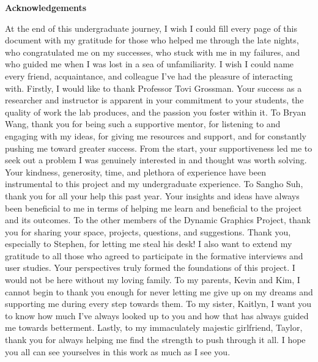 \documentclass[12pt]{report}
\begin{document}
\begin{myfont}
        \vspace*{\fill}
            \begin{center}
                \singlespacing
                \normalsize
                \begin{minipage}{0.8\textwidth}
                    \setlength{\parindent}{0pt}
                    \begin{center}
                        \Large\textbf{Acknowledgements}
                    \end{center}
                        At the end of this undergraduate journey, I wish I could fill every page of this document with my gratitude for those who helped me through the late nights, who congratulated me on my successes, who stuck with me in my failures, and who guided me when I was lost in a sea of unfamiliarity. I wish I could name every friend, acquaintance, and colleague I've had the pleasure of interacting with. Firstly, I would like to thank Professor Tovi Grossman. Your success as a researcher and instructor is apparent in your commitment to your students, the quality of work the lab produces, and the passion you foster within it. To Bryan Wang, thank you for being such a supportive mentor, for listening to and engaging with my ideas, for giving me resources and support, and for constantly pushing me toward greater success. From the start, your supportiveness led me to seek out a problem I was genuinely interested in and thought was worth solving. Your kindness, generosity, time, and plethora of experience have been instrumental to this project and my undergraduate experience. To Sangho Suh, thank you for all your help this past year. Your insights and ideas have always been beneficial to me in terms of helping me learn and beneficial to the project and its outcomes. To the other members of the Dynamic Graphics Project, thank you for sharing your space, projects, questions, and suggestions. Thank you, especially to Stephen, for letting me steal his desk! I also want to extend my gratitude to all those who agreed to participate in the formative interviews and user studies. Your perspectives truly formed the foundations of this project. I would not be here without my loving family. To my parents, Kevin and Kim, I cannot begin to thank you enough for never letting me give up on my dreams and supporting me during every step towards them. To my sister, Kaitlyn, I want you to know how much I've always looked up to you and how that has always guided me towards betterment. Lastly, to my immaculately majestic girlfriend, Taylor, thank you for always helping me find the strength to push through it all. I hope you all can see yourselves in this work as much as I see you.
                \end{minipage}
            \end{center}
        \vspace*{\fill}
        \clearpage
        

\end{myfont}
\end{document}

